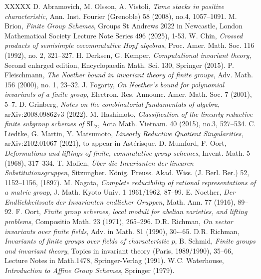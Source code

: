 \documentclass[reqno]{amsart}
\theoremstyle{definition}
\theoremstyle{plain}
\begin{document}
\begin{thebibliography}{XXXXX}
 D. Abramovich, M. Olsson, A. Vistoli, \textit{Tame stacks in positive characteristic},
Ann. Inst. Fourier (Grenoble) 58 (2008), no.4, 1057--1091.
 M. Brion, \textit{Finite Group Schemes},
Groups St Andrews 2022 in Newcastle, London Mathematical Society Lecture Note Series 496 (2025), 1-53.
 W. Chin, \textit{Crossed products of semisimple cocommutative Hopf algebras}, 
Proc. Amer. Math. Soc. 116 (1992), no. 2, 321--327.
 H. Derksen, G. Kemper, \textit{Computational invariant theory},
Second enlarged edition,
Encyclopaedia Math. Sci. 130, %
Springer (2015).
 P. Fleischmann, \textit{The Noether bound in invariant theory of finite groups},
Adv. Math. 156 (2000), no. 1, 23--32.
 J. Fogarty, \textit{On Noether's bound for polynomial invariants of a finite group},
Electron. Res. Announc. Amer. Math. Soc. 7 (2001), 5--7.
 D. Grinberg, \textit{Notes on the combinatorial fundamentals of algebra}, arXiv:2008.09862v3 (2022).
 M. Hashimoto, \textit{Classification of the linearly reductive finite subgroup schemes of $\mathrm{SL}_2$},
  Acta Math. Vietnam. 40 (2015), no.3, 527--534.
 C. Liedtke, G. Martin, Y. Matsumoto, \textit{Linearly Reductive Quotient Singularities},
arXiv:2102.01067 (2021), to appear in Ast\'erisque.
 D. Mumford, F. Oort, \textit{Deformations and liftings of finite, commutative group
schemes}, Invent. Math. 5 (1968), 317--334.
 T. Molien, \textit{\"Uber die Invarianten der linearen Substitutionsgruppen},
Sitzungber. K\"onig. Preuss. Akad. Wiss. (J. Berl. Ber.) 52, 1152--1156, (1897).
 M. Nagata, \textit{Complete reducibility of rational 
representations of a matric group}, J. Math. Kyoto Univ. 1 1961/1962, 87--99.
 E. Noether, \textit{Der Endlichkeitssatz der Invarianten endlicher Gruppen},
Math. Ann. 77 (1916), 89--92.
 F. Oort, \textit{Finite group schemes, local moduli for abelian varieties, and lifting
problems}, Compositio Math. 23 (1971), 265--296.
 D.R. Richman, \textit{On vector invariants over finite fields}, Adv. in Math. 81 (1990), 30-–65.
 D.R. Richman, \textit{Invariants of finite groups over fields of characteristic $p$},
 B. Schmid, \textit{Finite groups and invariant theory},
Topics in invariant theory (Paris, 1989/1990), 35--66,  Lecture Notes in Math.1478,
Springer-Verlag (1991).
 W.C. Waterhouse, \textit{Introduction to Affine Group Schemes}, Springer (1979).
\end{thebibliography}
\end{document}
